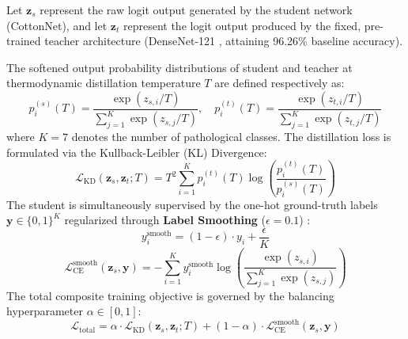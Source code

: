 \documentclass[journal,10pt,twocolumn]{IEEEtran}
\begin{document}
Let $\mathbf{z}_s$ represent the raw logit output generated by the student network (CottonNet), and let $\mathbf{z}_t$ represent the logit output produced by the fixed, pre-trained teacher architecture (DenseNet-121 \cite{huang2017densely}, attaining 96.26\% baseline accuracy).

The softened output probability distributions of student and teacher at thermodynamic distillation temperature $T$ are defined respectively as:
\begin{equation}
p_i^{(s)}(T) = \frac{\exp(z_{s, i} / T)}{\sum_{j=1}^K \exp(z_{s, j} / T)}, \quad p_i^{(t)}(T) = \frac{\exp(z_{t, i} / T)}{\sum_{j=1}^K \exp(z_{t, j} / T)}
\end{equation}
where $K = 7$ denotes the number of pathological classes. The distillation loss is formulated via the Kullback-Leibler (KL) Divergence:
\begin{equation}
\mathcal{L}_{\text{KD}}(\mathbf{z}_s, \mathbf{z}_t; T) = T^2 \sum_{i=1}^K p_i^{(t)}(T) \log\left(\frac{p_i^{(t)}(T)}{p_i^{(s)}(T)}\right)
\end{equation}
The student is simultaneously supervised by the one-hot ground-truth labels $\mathbf{y} \in \{0, 1\}^K$ regularized through \textbf{Label Smoothing} ($\epsilon = 0.1$) \cite{szegedy2016rethinking}:
\begin{equation}
y_i^{\text{smooth}} = (1 - \epsilon) \cdot y_i + \frac{\epsilon}{K}
\end{equation}
\begin{equation}
\mathcal{L}_{\text{CE}}^{\text{smooth}}(\mathbf{z}_s, \mathbf{y}) = - \sum_{i=1}^K y_i^{\text{smooth}} \log\left( \frac{\exp(z_{s, i})}{\sum_{j=1}^K \exp(z_{s, j})} \right)
\end{equation}
The total composite training objective is governed by the balancing hyperparameter $\alpha \in [0, 1]$:
\begin{equation}
\mathcal{L}_{\text{total}} = \alpha \cdot \mathcal{L}_{\text{KD}}(\mathbf{z}_s, \mathbf{z}_t; T) + (1 - \alpha) \cdot \mathcal{L}_{\text{CE}}^{\text{smooth}}(\mathbf{z}_s, \mathbf{y})
\end{equation}

\begin{table}[htbp]
\centering
\caption{Progressive three-phase Knowledge Distillation hyperparameter schedule.}
\label{tab:kd_schedule}
\end{table}
\end{document}
